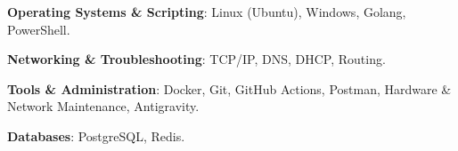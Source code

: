 \begin{cvempty} %
    \begin{cvitems} %
        \item{\textbf{Operating Systems \& Scripting}: Linux (Ubuntu), Windows, Golang, PowerShell.}
        \item{\textbf{Networking \& Troubleshooting}: TCP/IP, DNS, DHCP, Routing.}
        \item{\textbf{Tools \& Administration}: Docker, Git, GitHub Actions, Postman, Hardware \& Network Maintenance, Antigravity.}
        \item{\textbf{Databases}: PostgreSQL, Redis.}
    \end{cvitems}
\end{cvempty}
